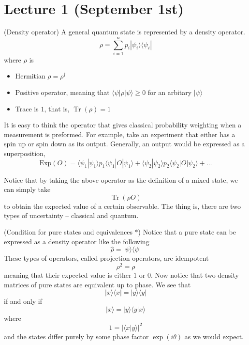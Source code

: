 \section{Lecture 1 (September 1st)}
\begin{defi}
(Density operator) A general quantum state is represented by a density operator. 
	\[{{\rho }=\sum ^{n}_{i=1}p_{i}|\psi _{i}\rangle\langle \psi _{i}| }\]
where ${\rho }$ is 
\begin{itemize}
	\item[(i)] Hermitian ${\rho }={\rho }^{\dagger}$
	\item[(ii)] Positive operator, meaning that $\langle \psi |{\rho }|\psi \rangle \geq 0$ for an arbitary $|\psi \rangle $
	\item[(iii)] Trace is $1$, that is, $\mathop{\mathrm{Tr}}({\rho })=1$
\end{itemize}
It is easy to think the operator that gives classical probability weighting when a measurement is preformed. For example, take an experiment that either has a spin up or spin down as its output. Generally, an output would be expressed as a superposition,
\[\mathrm{Exp}(O)=\langle \psi_1|\psi_1 \rangle p_1\langle \psi_1|O|\psi_1\rangle +\langle \psi_2|\psi_2\rangle p_2\langle \psi_2|O|\psi_2\rangle +\ldots  \]

Notice that by taking the above operator as the definition of a mixed state, we can simply take
\[\mathop{\mathrm{Tr}}({\rho }{O})\]
	to obtain the expected value of a certain observable. The thing is, there are two types of uncertainty -- classical and quantum.
\end{defi}
\vspace{2ex}
\begin{thm}
(Condition for pure states and equivalences $\ast$) Notice that a pure state can be expressed as a density operator like the following
\[\hat{\rho }=|\psi \rangle \langle \psi |\]
These types of operators, called projection operators, are idempotent 
\[{\rho ^2=\rho} \] 
meaning that their expected value is either $1$ or $0$. Now notice that two density matrices of pure states are equivalent up to phase. We see that
\[|x\rangle \langle x|=|y\rangle \langle y|\]
if and only if
\[|x\rangle =|y\rangle \langle y|x\rangle \]
where 
\[1=|\langle x|y\rangle |^2\]
and the states differ purely by some phase factor $\exp (i\theta )$ as we would expect.
\end{thm}
\vspace{2ex}

